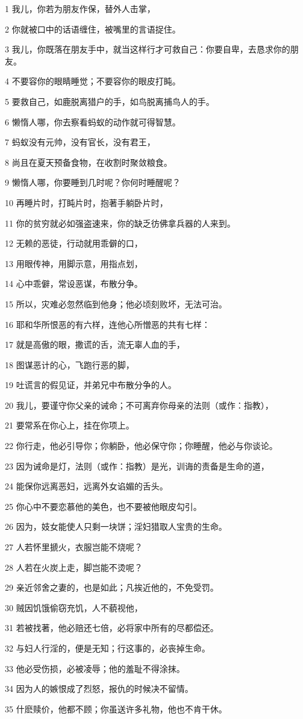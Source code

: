 \par 1 我儿，你若为朋友作保，替外人击掌，
\par 2 你就被口中的话语缠住，被嘴里的言语捉住。
\par 3 我儿，你既落在朋友手中，就当这样行才可救自己：你要自卑，去恳求你的朋友。
\par 4 不要容你的眼睛睡觉；不要容你的眼皮打盹。
\par 5 要救自己，如鹿脱离猎户的手，如鸟脱离捕鸟人的手。
\par 6 懒惰人哪，你去察看蚂蚁的动作就可得智慧。
\par 7 蚂蚁没有元帅，没有官长，没有君王，
\par 8 尚且在夏天预备食物，在收割时聚敛粮食。
\par 9 懒惰人哪，你要睡到几时呢？你何时睡醒呢？
\par 10 再睡片时，打盹片时，抱著手躺卧片时，
\par 11 你的贫穷就必如强盗速来，你的缺乏彷佛拿兵器的人来到。
\par 12 无赖的恶徒，行动就用乖僻的口，
\par 13 用眼传神，用脚示意，用指点划，
\par 14 心中乖僻，常设恶谋，布散分争。
\par 15 所以，灾难必忽然临到他身；他必顷刻败坏，无法可治。
\par 16 耶和华所恨恶的有六样，连他心所憎恶的共有七样：
\par 17 就是高傲的眼，撒谎的舌，流无辜人血的手，
\par 18 图谋恶计的心，飞跑行恶的脚，
\par 19 吐谎言的假见证，并弟兄中布散分争的人。
\par 20 我儿，要谨守你父亲的诫命；不可离弃你母亲的法则（或作：指教），
\par 21 要常系在你心上，挂在你项上。
\par 22 你行走，他必引导你；你躺卧，他必保守你；你睡醒，他必与你谈论。
\par 23 因为诫命是灯，法则（或作：指教）是光，训诲的责备是生命的道，
\par 24 能保你远离恶妇，远离外女谄媚的舌头。
\par 25 你心中不要恋慕他的美色，也不要被他眼皮勾引。
\par 26 因为，妓女能使人只剩一块饼；淫妇猎取人宝贵的生命。
\par 27 人若怀里搋火，衣服岂能不烧呢？
\par 28 人若在火炭上走，脚岂能不烫呢？
\par 29 亲近邻舍之妻的，也是如此；凡挨近他的，不免受罚。
\par 30 贼因饥饿偷窃充饥，人不藐视他，
\par 31 若被找著，他必赔还七倍，必将家中所有的尽都偿还。
\par 32 与妇人行淫的，便是无知；行这事的，必丧掉生命。
\par 33 他必受伤损，必被凌辱；他的羞耻不得涂抹。
\par 34 因为人的嫉恨成了烈怒，报仇的时候决不留情。
\par 35 什麽赎价，他都不顾；你虽送许多礼物，他也不肯干休。

